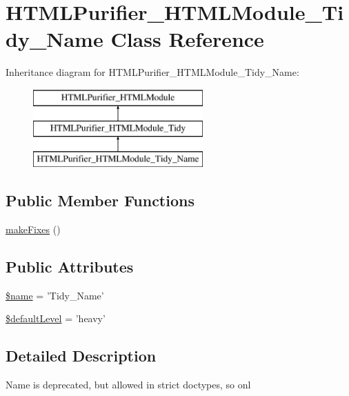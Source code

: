 \hypertarget{classHTMLPurifier__HTMLModule__Tidy__Name}{\section{H\+T\+M\+L\+Purifier\+\_\+\+H\+T\+M\+L\+Module\+\_\+\+Tidy\+\_\+\+Name Class Reference}
\label{classHTMLPurifier__HTMLModule__Tidy__Name}
}
Inheritance diagram for H\+T\+M\+L\+Purifier\+\_\+\+H\+T\+M\+L\+Module\+\_\+\+Tidy\+\_\+\+Name\+:\begin{figure}[H]
\begin{center}
\leavevmode
\includegraphics[height=3.000000cm]{classHTMLPurifier__HTMLModule__Tidy__Name}
\end{center}
\end{figure}
\subsection*{Public Member Functions}
\begin{DoxyCompactItemize}
\item 
\hyperlink{classHTMLPurifier__HTMLModule__Tidy__Name_ab3ee53770d6cb9f947bc5a3a045dbe9c}{make\+Fixes} ()
\end{DoxyCompactItemize}
\subsection*{Public Attributes}
\begin{DoxyCompactItemize}
\item 
\hyperlink{classHTMLPurifier__HTMLModule__Tidy__Name_aaea38af3cc35162d772bbc432dd2be0c}{\$name} = 'Tidy\+\_\+\+Name'
\item 
\hyperlink{classHTMLPurifier__HTMLModule__Tidy__Name_a336020f3dfda27ed5bead10dad1667f7}{\$default\+Level} = 'heavy'
\end{DoxyCompactItemize}


\subsection{Detailed Description}
Name is deprecated, but allowed in strict doctypes, so onl 

